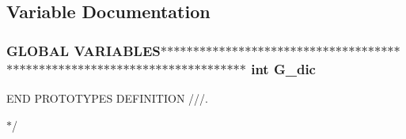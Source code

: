 \subsection{Variable Documentation}
\subsubsection[{G\_\-dic}]{\setlength{\rightskip}{0pt plus 5cm}GLOBAL VARIABLES$\ast$$\ast$$\ast$$\ast$$\ast$$\ast$$\ast$$\ast$$\ast$$\ast$$\ast$$\ast$$\ast$$\ast$$\ast$$\ast$$\ast$$\ast$$\ast$$\ast$$\ast$$\ast$$\ast$$\ast$$\ast$$\ast$$\ast$$\ast$$\ast$$\ast$$\ast$$\ast$$\ast$$\ast$$\ast$$\ast$$\ast$$\ast$$\ast$$\ast$$\ast$$\ast$$\ast$$\ast$$\ast$$\ast$$\ast$$\ast$$\ast$$\ast$$\ast$$\ast$$\ast$$\ast$$\ast$$\ast$$\ast$$\ast$$\ast$$\ast$$\ast$$\ast$$\ast$$\ast$$\ast$$\ast$$\ast$$\ast$$\ast$$\ast$$\ast$$\ast$$\ast$$\ast$ int {\bf G\_\-dic}}\label{d0/d29/main_8c_aa869580482bb454af010c4dcc837b88a}


END PROTOTYPES DEFINITION ///. 

$\ast$/ 